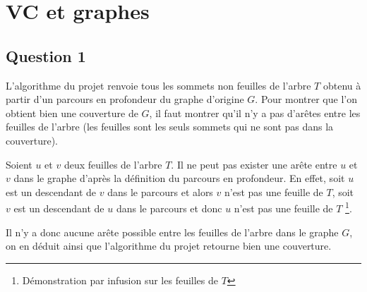  \section{VC et graphes}
	
  \subsection{Question 1\label{part2q1}}
  L'algorithme du projet renvoie tous les sommets non feuilles de
  l'arbre $T$ obtenu à partir d'un parcours en profondeur du graphe
  d'origine $G$. Pour montrer que l'on obtient bien une couverture de
  $G$, il faut montrer qu'il n'y a pas d'arêtes entre les feuilles de
  l'arbre (les feuilles sont les seuls sommets qui ne sont pas dans la
  couverture).

  Soient $u$ et $v$ deux feuilles de l'arbre $T$. Il ne peut pas exister
  une arête entre $u$ et $v$ dans le graphe d'après la définition du
  parcours en profondeur. En effet, soit $u$ est un descendant de $v$
  dans le parcours et alors $v$ n'est pas une feuille de $T$, soit $v$
  est un descendant de $u$ dans le parcours et donc $u$ n'est pas une
  feuille de $T$ \footnote{Démonstration par infusion sur les feuilles
  de $T$}.

  Il n'y a donc aucune arête possible entre les feuilles de l'arbre dans
  le graphe $G$, on en déduit ainsi que l'algorithme du projet retourne
  bien une couverture.

  